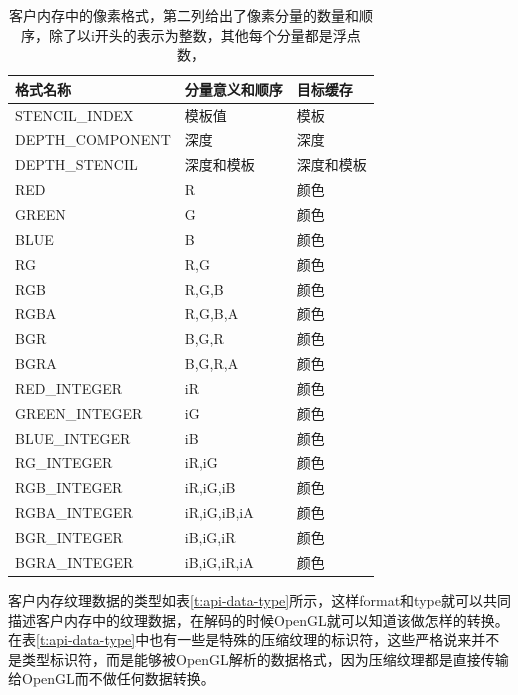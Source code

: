 \begin{table}
\caption{客户内存中的像素格式，第二列给出了像素分量的数量和顺序，除了以i开头的表示为整数，其他每个分量都是浮点数，}
\label{t:api-data-format}
\centering
\begin{tabular}{>{\small}p{}|>{\small}p{}|>{\small}p{}}
\hline 
   格式名称 & 分量意义和顺序 & 目标缓存 \\
    \hline  
    STENCIL\_INDEX   & 模板值      &模板\\
    DEPTH\_COMPONENT & 深度        &深度\\
    DEPTH\_STENCIL   & 深度和模板   &深度和模板\\
    RED              & R          &颜色\\
    GREEN            & G          &颜色\\
    BLUE             & B          &颜色\\
    RG               & R,G        &颜色\\
    RGB              & R,G,B      &颜色\\
    RGBA             & R,G,B,A    &颜色\\
    BGR              & B,G,R      &颜色\\
    BGRA             & B,G,R,A    &颜色\\
    RED\_INTEGER     & iR         &颜色\\
    GREEN\_INTEGER   & iG         &颜色\\
    BLUE\_INTEGER    & iB         &颜色\\
    RG\_INTEGER      & iR,iG        &颜色\\
    RGB\_INTEGER     & iR,iG,iB     &颜色\\
    RGBA\_INTEGER    & iR,iG,iB,iA  &颜色\\
    BGR\_INTEGER     & iB,iG,iR     &颜色\\
    BGRA\_INTEGER    & iB,iG,iR,iA  &颜色\\

 \hline 
\end{tabular}
\end{table}

客户内存纹理数据的类型如表\ref{t:api-data-type}所示，这样format和type就可以共同描述客户内存中的纹理数据，在解码的时候OpenGL就可以知道该做怎样的转换。在表\ref{t:api-data-type}中也有一些是特殊的压缩纹理的标识符，这些严格说来并不是类型标识符，而是能够被OpenGL解析的数据格式，因为压缩纹理都是直接传输给OpenGL而不做任何数据转换。

